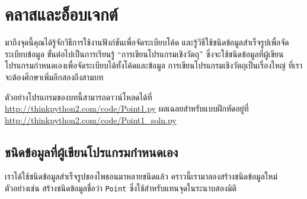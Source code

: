 \chapter{คลาสและอ็อบเจกต์} %
\label{clobjects}


มาถึงจุดนี้คุณได้รู้จักวิธีการใช้งานฟังก์ชันเพื่อจัดระเบียบโค้ด
และรู้วิธีใช้ชนิดข้อมูลสำเร็จรูปเพื่อจัดระเบียบข้อมูล 
ขั้นต่อไปเป็นการเรียนรู้ ``การเขียนโปรแกรมเชิงวัตถุ''
ซึ่งจะใช้ชนิดข้อมูลที่ผู้เขียนโปรแกรมกำหนดเองเพื่อจัดระเบียบได้ทั้งโค้ดและข้อมูล 
การเขียนโปรแกรมเชิงวัตถุเป็นเรื่องใหญ่ ที่เราจะต้องศึกษาเพิ่มอีกสองถึงสามบท



ตัวอย่างโปรแกรมของบทนี้สามารถดาวน์โหลดได้ที่ \url{http://thinkpython2.com/code/Point1.py}
ผลเฉลยสำหรับแบบฝึกหัดอยู่ที่ \url{http://thinkpython2.com/code/Point1_soln.py}


\section{ชนิดข้อมูลที่ผู้เขียนโปรแกรมกำหนดเอง} %
\label{point}


เราได้ใช้ชนิดข้อมูลสำเร็จรูปของไพธอนมาหลายชนิดแล้ว คราวนี้เรามาลองสร้างชนิดข้อมูลใหม่ ตัวอย่างเช่น สร้างชนิดข้อมูลชื่อว่า {\tt Point} ซึ่งใช้สำหรับแทนจุดในระนาบสองมิติ



